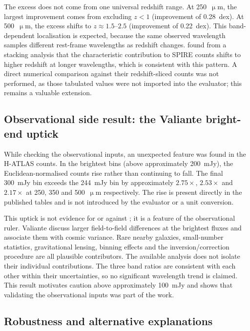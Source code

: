 \documentclass[12pt,a4paper]{article}
\begin{document}
The excess does not come from one universal redshift range. At 250~$\upmu$m, the
largest improvement comes from excluding $z < 1$ (improvement of
\SI{0.28}{dex}). At 500~$\upmu$m, the excess shifts to $z \approx 1.5$--$2.5$
(improvement of \SI{0.22}{dex}). This band-dependent localisation is expected, because
the same observed wavelength samples different rest-frame wavelengths as redshift
changes. \citet{B_thermin_2012} found from a stacking analysis that the characteristic
contribution to SPIRE counts shifts to higher redshift at longer wavelengths, which is
consistent with this pattern. A direct numerical comparison against their
redshift-sliced counts was not performed, as those tabulated values were not imported
into the evaluator; this remains a valuable extension.

\subsection{Observational side result: the Valiante bright-end uptick}
\label{sec:results:valiante}

While checking the observational inputs, an unexpected feature was found in the
\citet{Valiante_2016} H-ATLAS counts. In the brightest bins (above approximately
\SI{200}{mJy}), the Euclidean-normalised counts rise rather than continuing to fall.
The final \SI{300}{mJy} bin exceeds the \SI{244}{mJy} bin by approximately
$2.75\times$, $2.53\times$ and $2.17\times$ at 250, 350 and 500~$\upmu$m respectively.
The rise is present directly in the published tables and is not introduced by the
evaluator or a unit conversion.

This uptick is not evidence for or against \popcosmos{}; it is a feature of the
observational ruler. Valiante discuss larger field-to-field differences at the brightest
fluxes and associate them with cosmic variance. Rare nearby galaxies, small-number
statistics, gravitational lensing, binning effects and the inversion/correction
procedure are all plausible contributors. The available analysis does not isolate their
individual contributions. The three band ratios are consistent with each other within
their uncertainties, so no significant wavelength trend is claimed. This result
motivates caution above approximately \SI{100}{mJy} and shows that validating the
observational inputs was part of the work.

\subsection{Robustness and alternative explanations}
\label{sec:results:robustness}
\end{document}
